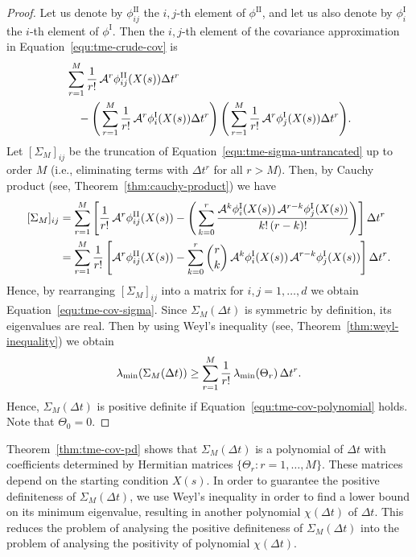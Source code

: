 \begin{proof}
	Let us denote by $\phi^{\mathrm{II}}_{ij}$ the $i,j$-th element of $\phi^{\mathrm{II}}$, and let us also denote by $\phi^{\mathrm{I}}_{i}$ the $i$-th element of $\phi^{\mathrm{I}}$. Then the $i,j$-th element of the covariance approximation in Equation~\eqref{equ:tme-crude-cov} is
	\begin{equation}
		\begin{split}
			&\sum^M_{r=1} \frac{1}{r!} \, \mathcal{A}^r \phi^{\mathrm{II}}_{ij}(X(s)) \Delta t^r\\
			&\quad- \Bigg(\sum^M_{r=1} \frac{1}{r!} \, \mathcal{A}^r \phi^{\mathrm{I}}_i(X(s)) \Delta t^r\Bigg) \, \Bigg(\sum^M_{r=1} \frac{1}{r!} \, \mathcal{A}^r \phi^{\mathrm{I}}_j(X(s)) \Delta t^r\Bigg).
			\label{equ:tme-sigma-untrancated}
		\end{split}
	\end{equation}
	Let $[\Sigma_M]_{ij}$ be the truncation of Equation~\eqref{equ:tme-sigma-untrancated} up to order $M$ (i.e., eliminating terms with $\Delta t^r$ for all $r>M$).
	Then, by Cauchy product (see, Theorem~\ref{thm:cauchy-product}) we have
	\begin{equation}
		\begin{split}
			[\Sigma_M]_{ij} &= \sum^M_{r=1} \left[ \frac{1}{r!} \, \mathcal{A}^r \phi^{\mathrm{II}}_{ij}(X(s)) - \Bigg(\sum^r_{k=0} \frac{\mathcal{A}^k \phi^{\mathrm{I}}_i(X(s)) \, \mathcal{A}^{r-k} \phi^{\mathrm{I}}_j(X(s))}{k!\,(r-k)!}\Bigg)\right]  \Delta t^r \\
			&= \sum^M_{r=1} \frac{1}{r!} \, \Bigg[ \mathcal{A}^r \phi^{\mathrm{II}}_{ij}(X(s)) - \sum^r_{k=0}\binom{r}{k}\, \mathcal{A}^k \phi^{\mathrm{I}}_i(X(s)) \, \mathcal{A}^{r-k} \phi^{\mathrm{I}}_j(X(s)) \Bigg]\, \Delta t^r. \nonumber
		\end{split}
	\end{equation}
	Hence, by rearranging $[\Sigma_M]_{ij}$ into a matrix for $i,j=1,\ldots,d$ we obtain Equation~\eqref{equ:tme-cov-sigma}. Since $\Sigma_M(\Delta t)$ is symmetric by definition, its eigenvalues are real. Then by using Weyl's inequality (see, Theorem~\ref{thm:weyl-inequality}) we obtain
	\begin{equation}
		\lambda_{\mathrm{min}}(\Sigma_M(\Delta t)) \geq \sum^M_{r=1} \frac{1}{r!} \, \lambda_{\mathrm{min}}(\Theta_{r}) \, \Delta t^r.
	\end{equation}
	Hence, $\Sigma_M(\Delta t)$ is positive definite if Equation~\eqref{equ:tme-cov-polynomial} holds. Note that $\Theta_0 = 0$.
\end{proof}

Theorem~\ref{thm:tme-cov-pd} shows that $\Sigma_M(\Delta t)$ is a polynomial of $\Delta t$ with coefficients determined by Hermitian matrices $\lbrace \Theta_r\colon r=1,\ldots,M \rbrace$. These matrices depend on the starting condition $X(s)$. In order to guarantee the positive definiteness of $\Sigma_M(\Delta t)$, we use Weyl's inequality in order to find a lower bound on its minimum eigenvalue, resulting in another polynomial $\chi(\Delta t)$ of $\Delta t$. This reduces the problem of analysing the positive definiteness of $\Sigma_M(\Delta t)$ into the problem of analysing the positivity of polynomial $\chi(\Delta t)$.


